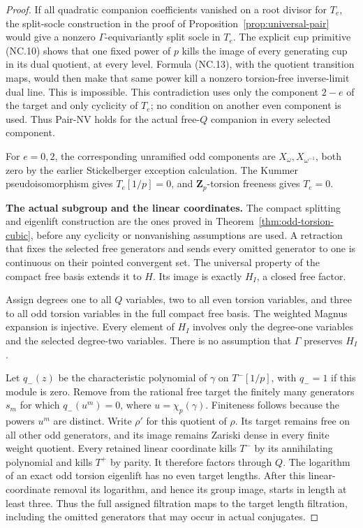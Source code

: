 \begin{proof}
If all quadratic companion coefficients vanished on a root
divisor for $T_e$, the split-socle construction in the proof of
Proposition~\ref{prop:universal-pair} would give a nonzero
$\Gamma$-equivariantly split socle in $T_e$. The explicit cup
primitive (NC.10) shows that one fixed power of $p$ kills the
image of every generating cup in its dual quotient, at every
level. Formula (NC.13), with the quotient transition maps,
would then make that same power kill a nonzero torsion-free
inverse-limit dual line. This is impossible. This contradiction
uses only the component $2-e$ of the target and only cyclicity
of $T_e$; no condition on another even component is used.
Thus Pair-NV holds for the actual free-$Q$ companion in every
selected component.

For $e=0,2$, the corresponding unramified odd components are
$X_\omega,X_{\omega^{-1}}$, both zero by the earlier
Stickelberger exception calculation. The Kummer
pseudoisomorphism gives $T_e[1/p]=0$, and $\mathbf Z_p$-torsion
freeness gives $T_e=0$.

\par\medskip\noindent\textbf{The actual subgroup and the linear coordinates.}
The compact splitting and eigenlift construction are the ones
proved in Theorem~\ref{thm:odd-torsion-cubic}, before any
cyclicity or nonvanishing assumptions are used. A retraction
that fixes the selected free generators and sends every omitted
generator to one is continuous on their pointed convergent
set. The universal property of the compact free basis extends
it to $H$. Its image is exactly $H_I$, a closed free factor.

Assign degrees one to all $Q$ variables, two to all even
torsion variables, and three to all odd torsion variables in
the full compact free basis. The weighted Magnus expansion is
injective. Every element of $H_I$ involves only the degree-one
variables and the selected degree-two variables. There is no
assumption that $\Gamma$ preserves $H_I$.

Let $q_-(z)$ be the characteristic polynomial of $\gamma$ on
$T^-[1/p]$, with $q_-=1$ if this module is zero. Remove from
the rational free target the finitely many generators $s_m$
for which $q_-(u^m)=0$, where $u=\chi_p(\gamma)$. Finiteness
follows because the powers $u^m$ are distinct. Write $\rho'$
for this quotient of $\rho$. Its target remains free on all
other odd generators, and its image remains Zariski dense in
every finite weight quotient. Every retained linear coordinate
kills $T^-$ by its annihilating polynomial and kills $T^+$
by parity. It therefore factors through $Q$.
The logarithm of an exact odd torsion eigenlift has no even
target lengths. After this linear-coordinate removal its
logarithm, and hence its group image, starts in length at least
three. Thus the full assigned filtration maps
to the target length filtration, including the omitted
generators that may occur in actual conjugates.


\end{proof}
